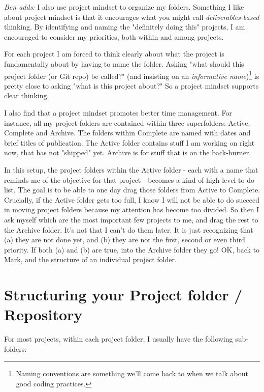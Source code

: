 \documentclass[12pt,letterpaper]{article}
\newenvironment{ben}{\quote\justify\fontfamily{cmtt}\selectfont\small}{\par}
\begin{document}
\begin{ben}
	\textit{Ben adds:}
		I also use project mindset to organize my folders.
		Something I like about project mindset is that it encourages what you might call \emph{deliverables-based} thinking.
		By identifying and naming the "definitely doing this" projects, I am encouraged to consider my priorities, both within and among projects.

		For each project I am forced to think clearly about what the project is fundamentally about by having to name the folder.
		Asking "what should this project folder (or Git repo) be called?" (and insisting on an \emph{informative name})\footnote{Naming conventions are something we'll come back to when we talk about good coding practices.}
		is pretty close to asking "what is this project about?"
		So a project mindset supports clear thinking.

		I also find that a project mindset promotes better time management.
		For instance, all my project folders are contained within three superfolders: Active, Complete and Archive.
		The folders within Complete are named with dates and brief titles of publication.
		The Active folder contains stuff I am working on right now, that has not "shipped" yet.
		Archive is for stuff that is on the back-burner.

		In this setup, the project folders within the Active folder - each with a name that reminds me of the objective for that project - becomes a kind of high-level to-do list.
		The goal is to be able to one day drag those folders from Active to Complete.
		Crucially, if the Active folder gets too full, I know I will not be able to do succeed in moving project folders because my attention has become too divided.
		So then I ask myself which are the most important few projects to me, and drag the rest to the Archive folder.
		It's not that I can't do them later.
		It is just recognizing that (a) they are not done yet, and (b) they are not the first, second or even third priority.
		If both (a) and (b) are true, into the Archive folder they go!
		OK, back to Mark, and the structure of an individual project folder.
\end{ben}




\section{Structuring your Project folder / Repository} \label{projectfolder}

For most projects, within each project folder, I usually have the following sub-folders:
\end{document}
